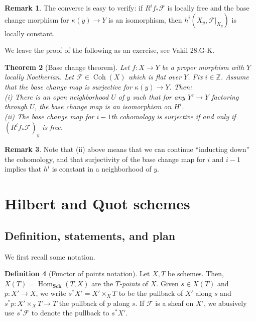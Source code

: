 \documentclass[10pt]{article}
\newtheorem{thm}{Theorem}[section]
\theoremstyle{definition}
\newtheorem{defn}[thm]{Definition}
\newtheorem{rmk}[thm]{Remark}
\DeclareMathOperator{\Hom}{Hom}
\DeclareMathOperator{\Coh}{Coh}
\DeclareMathOperator{\Spec}{Spec}
\DeclareMathOperator{\Tor}{Tor}
\newcommand{\mf}{\mathfrak}
\newcommand{\cat}{\mathbf}
\newcommand{\Z}{\mathbb{Z}}
\begin{document}
\begin{rmk}
The converse is easy to verify: if $R^if_* \mathcal{F}$ is locally free and the base change morphism for $\kappa(y) \rightarrow Y$ is an isomorphism, then $h^i(X_y, \mathcal{F}|_{X_y})$ is locally constant.
\end{rmk}


We leave the proof of the following as an exercise, see Vakil 28.G-K.
\begin{thm}[Base change theorem]
Let $f: X \rightarrow Y$ be a proper morphism with $Y$ locally Noetherian.  Let $\mathcal{F} \in \Coh(X)$ which is flat over $Y$.  Fix $i \in \Z$.  Assume that the base change map is surjective for $\kappa(y) \rightarrow Y$.  Then: \\
\indent (i) There is an open neighborhood $U$ of $y$ such that for any $Y' \rightarrow Y$ factoring through $U$, the base change map is an isomorphism on $H^i$. \\
\indent (ii) The base change map for $i-1$th cohomology is surjective if and only if $(R^if_* \mathcal{F})_y$ is free.
\end{thm}

\begin{rmk}
Note that (ii) above means that we can continue ``inducting down'' the cohomology, and that surjectivity of the base change map for $i$ and $i-1$ implies that $h^i$ is constant in a neighborhood of $y$.
\end{rmk}

%
%


\newpage


\section{Hilbert and Quot schemes}

\subsection{Definition, statements, and plan}

We first recall some notation.
\begin{defn}[Functor of points notation]
Let $X, T$ be schemes.  Then, $X(T) = \Hom_{\cat{Sch}}(T, X)$ are the \emph{$T$-points} of $X$.  Given $s \in X(T)$ and $p: X' \rightarrow X$, we write $s^*X' = X' \times_X T$ to be the pullback of $X'$ along $s$ and $s^* p: X' \times_X T \rightarrow T$ the pullback of $p$ along $s$.  If $\mathcal{F}$ is a sheaf on $X'$, we abusively use $s^* \mathcal{F}$ to denote the pullback to $s^*X'$.
\end{defn}
\end{document}
